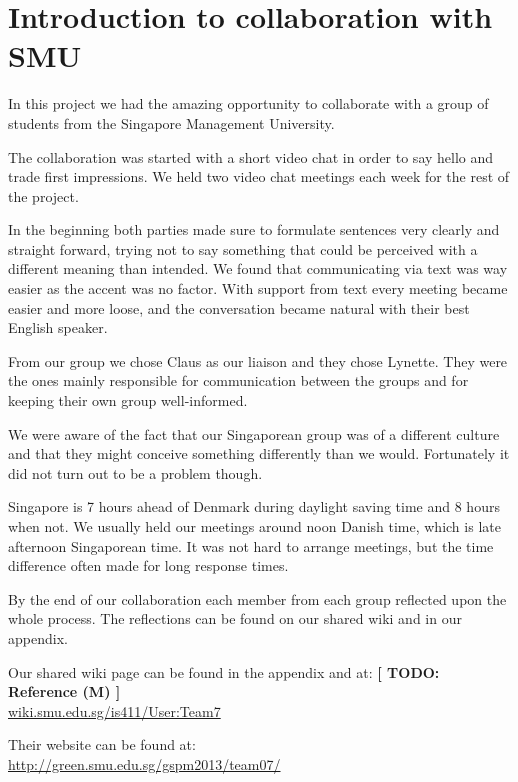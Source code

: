 \section{Introduction to collaboration with SMU}
In this project we had the amazing opportunity to collaborate with a group of students from the Singapore Management University.

The collaboration was started with a short video chat in order to say hello and trade first impressions. We held two video chat meetings each week for the rest of the project.

In the beginning both parties made sure to formulate sentences very clearly and straight forward, trying not to say something that could be perceived with a different meaning than intended. We found that communicating via text was way easier as the accent was no factor.
With support from text every meeting became easier and more loose, and the conversation became natural with their best English speaker.

From our group we chose Claus as our liaison and they chose Lynette. They were the ones mainly responsible for communication between the groups and for keeping their own group well-informed.

We were aware of the fact that our Singaporean group was of a different culture and that they might conceive something differently than we would. Fortunately it did not turn out to be a problem though.

Singapore is 7 hours ahead of Denmark during daylight saving time and 8 hours when not. We usually held our meetings around noon Danish time, which is late afternoon Singaporean time. It was not hard to arrange meetings, but the time difference often made for long response times.

By the end of our collaboration each member from each group reflected upon the whole process. The reflections can be found on our shared wiki and in our appendix.

Our shared wiki page can be found in the appendix and at: \textbf{[ TODO: Reference (M) ]}
\\\url{wiki.smu.edu.sg/is411/User:Team7}

Their website can be found at:
\\\url{http://green.smu.edu.sg/gspm2013/team07/}
\newpage
